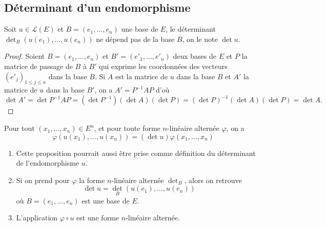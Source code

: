 \documentclass[class=report,crop=false]{standalone}
\begin{document}
\subsection{Déterminant d'un endomorphisme}

\begin{proposition}
Soit $u\in \mathcal{L}(E)$ et $B=(e_1,\dots,e_n)$ une base de $E$,  
le déterminant $\det_B(u(e_1),\dots,u(e_n))$ ne dépend pas de la 
base $B$, on le note $\det u$.
\end{proposition}

\begin{proof}
Soient $B=(e_1,\dots,e_n)$ et $B'=(e'_1,\dots,e'_n)$ deux bases de $E$ 
et $P$ la matrice de passage de $B$ à $B'$ qui exprime les coordonnées 
des vecteurs $(e'_{j})_{1\leq j\leq n}$ dans la base $B$.
Si $A$ est la matrice de $u$ dans la base $B$ et $A'$ la matrice de $u$ 
dans la base $B'$, on a 
$A'=P^{-1}AP$ d'où
$$\det A'=\det P^{-1}AP=(\det P^{-1})(\det A)(\det P)
=(\det P)^{-1}(\det A)(\det P)=\det A.$$
\end{proof}


\begin{proposition}
Pour tout $(x_1,\dots, x_n)\in E^n$, et pour toute forme $n$-linéaire alternée
$\varphi$, on a
$$\varphi(u(x_1),\dots,u(x_n))= (\det u)\varphi(x_1,\dots, x_n)$$  
\end{proposition}


\begin{remarque*}
\begin{enumerate}
  \item Cette proposition pourrait aussi être prise comme définition 
  du déterminant de l'endomorphisme $u$.

  \item Si on prend pour $\varphi$ la forme $n$-linéaire alternée $\det_B$, alors on retrouve 
$$\det u=\det_B(u(e_1),\dots,u(e_n))$$ où $B=(e_1,\dots,e_n)$ est une base de $E$.

  \item L'application $\varphi\circ u$ est une forme $n$-linéaire alternée.
\end{enumerate}  
\end{remarque*}
\end{document}
